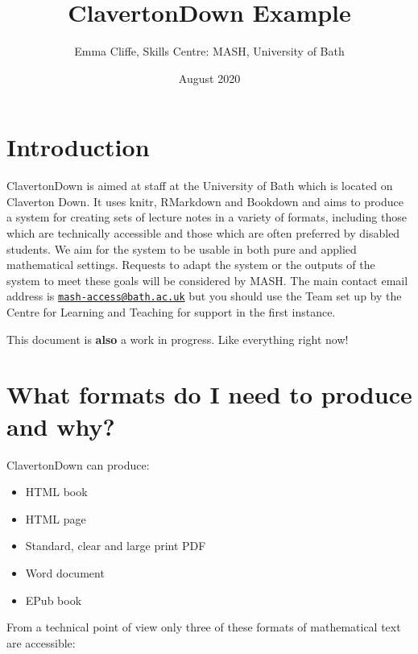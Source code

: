 \documentclass[
  10pt,
  a4paper]{article}
\title{ClavertonDown Example}
\author{Emma Cliffe, Skills Centre: MASH, University of Bath}
\date{August 2020}
\providecommand{\tightlist}{%
  \setlength{\itemsep}{0pt}\setlength{\parskip}{0pt}}
\theoremstyle{plain}
\theoremstyle{definition}
\theoremstyle{plain}
\theoremstyle{plain}
\theoremstyle{plain}
\theoremstyle{plain}
\theoremstyle{definition}
\theoremstyle{definition}
\theoremstyle{remark}
\theoremstyle{remark}
\begin{document}
\maketitle

{
\setcounter{tocdepth}{2}
\tableofcontents
}
\newpage
{}

\hypertarget{introduction}{%
\section*{Introduction}\label{introduction}}

ClavertonDown is aimed at staff at the University of Bath which is located on Claverton Down. It uses knitr, RMarkdown and Bookdown and aims to produce a system for creating sets of lecture notes in a variety of formats, including those which are technically accessible and those which are often preferred by disabled students. We aim for the system to be usable in both pure and applied mathematical settings. Requests to adapt the system or the outputs of the system to meet these goals will be considered by MASH. The main contact email address is \href{mailto:mash-access@bath.ac.uk}{\nolinkurl{mash-access@bath.ac.uk}} but you should use the Team set up by the Centre for Learning and Teaching for support in the first instance.

This document is \textbf{also} a work in progress. Like everything right now!

\hypertarget{what-formats-do-i-need-to-produce-and-why}{%
\section{What formats do I need to produce and why?}\label{what-formats-do-i-need-to-produce-and-why}}

ClavertonDown can produce:

\begin{itemize}
\tightlist
\item
  HTML book
\item
  HTML page
\item
  Standard, clear and large print PDF
\item
  Word document
\item
  EPub book
\end{itemize}

From a technical point of view only three of these formats of mathematical text are accessible:
\end{document}
